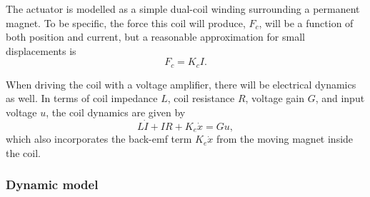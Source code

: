 The actuator is modelled as a simple dual-coil winding
surrounding a permanent magnet. To be specific, the force this coil
will produce, $F_c$, will be a function of both position and current, but a
reasonable approximation for small displacements is
\begin{equation}
  F_c = K_cI.
\end{equation}

When driving the coil with a voltage amplifier, there will be
electrical dynamics as well. In terms of coil impedance $L$, coil
resistance $R$, voltage gain $G$, and input voltage $u$, the coil
dynamics are given by
\begin{equation}
  L\dot I + IR + K_e\dot x = Gu,
\end{equation}
which also incorporates the back-emf term $K_e\dot x$ from the moving magnet
inside the coil.

\subsubsection{Dynamic model}

